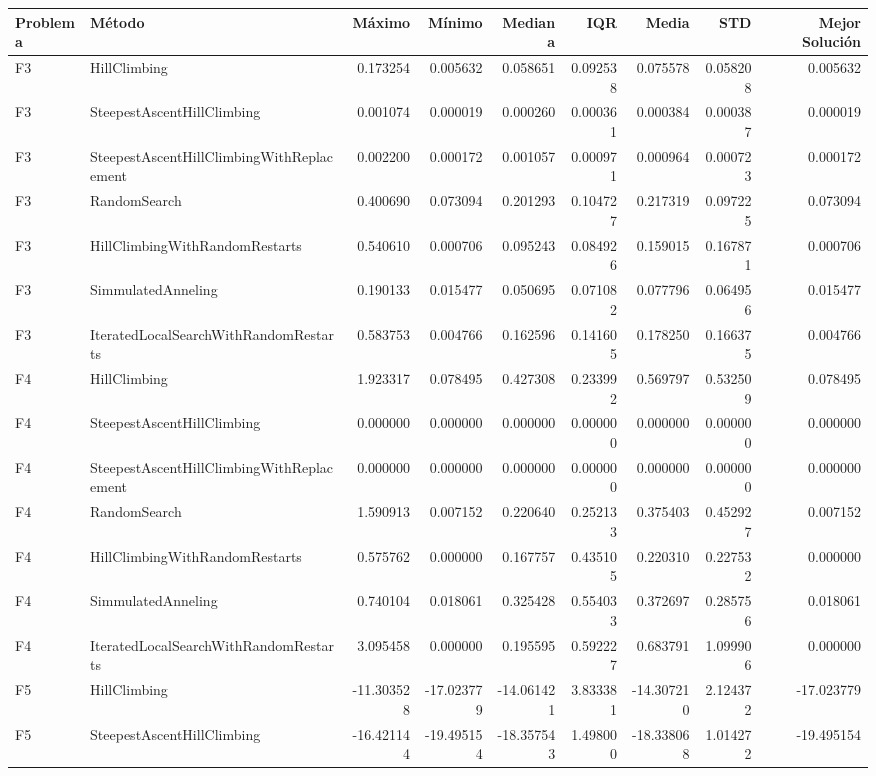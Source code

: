 \begin{tabular}{llrrrrrrr}
\toprule
Problema & Método & Máximo & Mínimo & Mediana & IQR & Media & STD & Mejor Solución \\
\midrule
F3 & HillClimbing & 0.173254 & 0.005632 & 0.058651 & 0.092538 & 0.075578 & 0.058208 & 0.005632 \\
F3 & SteepestAscentHillClimbing & 0.001074 & 0.000019 & 0.000260 & 0.000361 & 0.000384 & 0.000387 & 0.000019 \\
F3 & SteepestAscentHillClimbingWithReplacement & 0.002200 & 0.000172 & 0.001057 & 0.000971 & 0.000964 & 0.000723 & 0.000172 \\
F3 & RandomSearch & 0.400690 & 0.073094 & 0.201293 & 0.104727 & 0.217319 & 0.097225 & 0.073094 \\
F3 & HillClimbingWithRandomRestarts & 0.540610 & 0.000706 & 0.095243 & 0.084926 & 0.159015 & 0.167871 & 0.000706 \\
F3 & SimmulatedAnneling & 0.190133 & 0.015477 & 0.050695 & 0.071082 & 0.077796 & 0.064956 & 0.015477 \\
F3 & IteratedLocalSearchWithRandomRestarts & 0.583753 & 0.004766 & 0.162596 & 0.141605 & 0.178250 & 0.166375 & 0.004766 \\
F4 & HillClimbing & 1.923317 & 0.078495 & 0.427308 & 0.233992 & 0.569797 & 0.532509 & 0.078495 \\
F4 & SteepestAscentHillClimbing & 0.000000 & 0.000000 & 0.000000 & 0.000000 & 0.000000 & 0.000000 & 0.000000 \\
F4 & SteepestAscentHillClimbingWithReplacement & 0.000000 & 0.000000 & 0.000000 & 0.000000 & 0.000000 & 0.000000 & 0.000000 \\
F4 & RandomSearch & 1.590913 & 0.007152 & 0.220640 & 0.252133 & 0.375403 & 0.452927 & 0.007152 \\
F4 & HillClimbingWithRandomRestarts & 0.575762 & 0.000000 & 0.167757 & 0.435105 & 0.220310 & 0.227532 & 0.000000 \\
F4 & SimmulatedAnneling & 0.740104 & 0.018061 & 0.325428 & 0.554033 & 0.372697 & 0.285756 & 0.018061 \\
F4 & IteratedLocalSearchWithRandomRestarts & 3.095458 & 0.000000 & 0.195595 & 0.592227 & 0.683791 & 1.099906 & 0.000000 \\
F5 & HillClimbing & -11.303528 & -17.023779 & -14.061421 & 3.833381 & -14.307210 & 2.124372 & -17.023779 \\
F5 & SteepestAscentHillClimbing & -16.421144 & -19.495154 & -18.357543 & 1.498000 & -18.338068 & 1.014272 & -19.495154 \\

\end{tabular}
